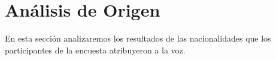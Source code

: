 





\clearpage
\section{Análisis de Origen}

En esta sección analizaremos los resultados de las nacionalidades que los participantes de la encuesta atribuyeron a la voz.

